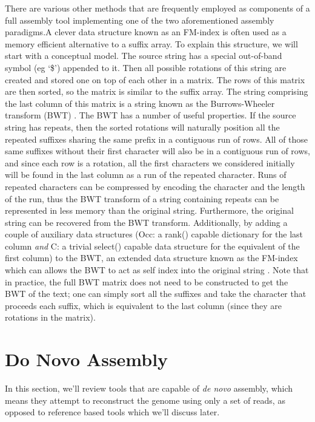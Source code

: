 \documentclass[doctor]{thesis}
\begin{document}
There are various other methods that are frequently employed as components of a full assembly tool implementing one of the two aforementioned assembly paradigms.A clever data structure known as an FM-index is often used as a memory efficient alternative to a suffix array.
To explain this structure, we will start with a conceptual model.
The source string has a special out-of-band symbol (eg `\$') appended to it.
Then all possible rotations of this string are created and stored one on top of each other in a matrix.
The rows of this matrix are then sorted, so the matrix is similar to the suffix array.
The string comprising the last column of this matrix is a string known as the Burrows-Wheeler transform (BWT)  \cite{burrows1994block}.
The BWT has a number of useful properties.
If the source string has repeats, then the sorted rotations will naturally position all the repeated suffixes sharing the same prefix in a contiguous run of rows.
All of those same suffixes without their first character will also be in a contiguous run of rows, and since each row is a rotation, all the first characters we considered initially will be found in the last column as a run of the repeated character.
Runs of repeated characters can be compressed by encoding the character and the length of the run, thus the BWT transform of a string containing repeats can be represented in less memory than the original string.
Furthermore, the original string can be recovered from the BWT transform.
Additionally, by adding a couple of auxiliary data structures (Occ: a rank() capable dictionary for the last column \emph{and } C: a trivial select() capable data structure for the equivalent of the first column) to the BWT, an extended data structure known as the FM-index which can allows the BWT to act as self index into the original string \cite{ferragina2000opportunistic}.
Note that in practice, the full BWT matrix does not need to be constructed to get the BWT of the text; one can simply sort all the suffixes and take the character that proceeds each suffix, which is equivalent to the last column (since they are rotations in the matrix).  
 

\makeatletter{}\section{Do Novo Assembly}

In this section, we'll review tools that are capable of \emph{de novo} assembly, which means they attempt to reconstruct the genome using only a set of reads, as opposed to reference based tools which we'll discuss later.
\end{document}
